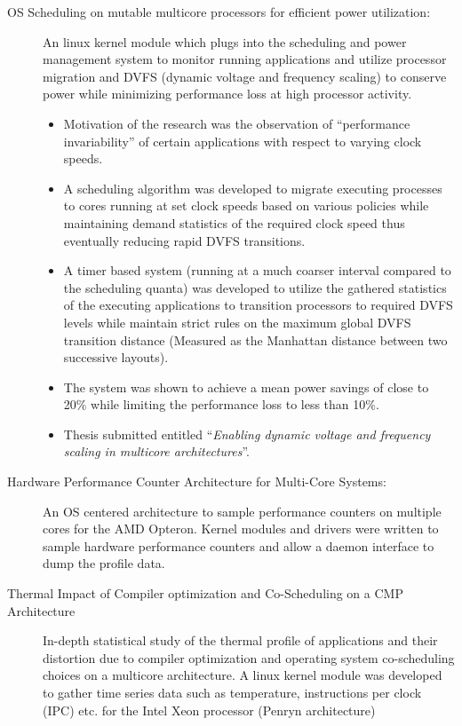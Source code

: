 \begin{description}
\item[OS Scheduling on mutable multicore processors for efficient power utilization:] An linux kernel module which plugs into the scheduling and power management system to monitor running applications and utilize processor migration and DVFS (dynamic voltage and frequency scaling) to conserve power while minimizing performance loss at high processor activity.
\begin{itemize}
\item Motivation of the research was the observation of ``performance invariability'' of certain applications with respect to varying clock speeds.
\item A scheduling algorithm was developed to migrate executing processes to cores running at set clock speeds based on various policies while maintaining demand statistics of the required clock speed thus eventually reducing rapid DVFS transitions.
\item A timer based system (running at a much coarser interval compared to the scheduling quanta) was developed to utilize the gathered statistics of the executing applications to transition processors to required DVFS levels while maintain strict rules on the maximum global DVFS transition distance (Measured as the Manhattan distance between two successive layouts).
\item The system was shown to achieve a mean power savings of close to 20\% while limiting the performance loss to less than 10\%.
\item Thesis submitted entitled ``\textit{Enabling dynamic voltage and frequency scaling in multicore architectures}''.
\end{itemize}

\item[Hardware Performance Counter Architecture for Multi-Core Systems:]
An OS centered architecture to sample performance counters on multiple cores for the AMD Opteron.
Kernel modules and drivers were written to sample hardware performance counters and allow a daemon interface to dump the profile data.

\item[Thermal Impact of Compiler optimization and Co-Scheduling on a CMP Architecture]
In-depth statistical study of the thermal profile of applications and their distortion due to compiler optimization and operating system co-scheduling choices on a multicore architecture. A linux kernel module was developed to gather time series data such as temperature, instructions per clock (IPC) etc. for the Intel Xeon processor (Penryn architecture)


\end{description}
